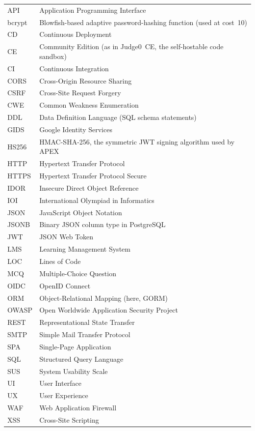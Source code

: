 \begin{longtable}{L{3.2cm} L{10.5cm}}
API & Application Programming Interface \\
bcrypt & Blowfish-based adaptive password-hashing function (used at cost~10) \\
CD & Continuous Deployment \\
CE & Community Edition (as in Judge0~CE, the self-hostable code sandbox) \\
CI & Continuous Integration \\
CORS & Cross-Origin Resource Sharing \\
CSRF & Cross-Site Request Forgery \\
CWE & Common Weakness Enumeration \\
DDL & Data Definition Language (SQL schema statements) \\
GIDS & Google Identity Services \\
HS256 & HMAC-SHA-256, the symmetric JWT signing algorithm used by APEX \\
HTTP & Hypertext Transfer Protocol \\
HTTPS & Hypertext Transfer Protocol Secure \\
IDOR & Insecure Direct Object Reference \\
IOI & International Olympiad in Informatics \\
JSON & JavaScript Object Notation \\
JSONB & Binary JSON column type in PostgreSQL \\
JWT & JSON Web Token \\
LMS & Learning Management System \\
LOC & Lines of Code \\
MCQ & Multiple-Choice Question \\
OIDC & OpenID Connect \\
ORM & Object-Relational Mapping (here, GORM) \\
OWASP & Open Worldwide Application Security Project \\
REST & Representational State Transfer \\
SMTP & Simple Mail Transfer Protocol \\
SPA & Single-Page Application \\
SQL & Structured Query Language \\
SUS & System Usability Scale \\
UI & User Interface \\
UX & User Experience \\
WAF & Web Application Firewall \\
XSS & Cross-Site Scripting \\

\end{longtable}

